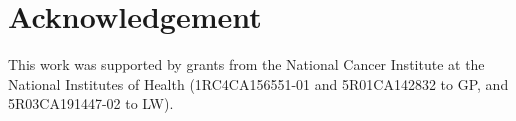 \documentclass{bioinfo}
\begin{document}






\section{Acknowledgement}

This work was supported by grants from the National Cancer Institute
at the National Institutes of Health (1RC4CA156551-01 and 5R01CA142832
to GP, and 5R03CA191447-02 to LW).




\end{document}
